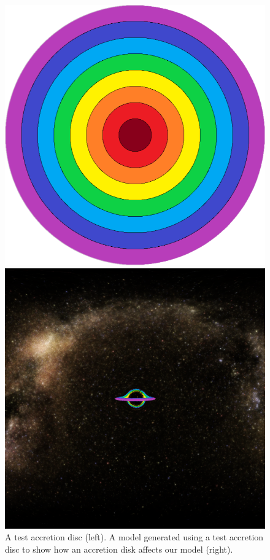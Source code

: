 \documentclass[oneside,openright,frontopenright, singlespacing]{dmathesis}
\begin{document}
\begin{figure}[!ht]
	\centering
	\begin{minipage}{0.5\textwidth}
		\centering
		\includegraphics[width=0.9\linewidth]{img/test-accretion}
	\end{minipage}%
	\hfill
	\begin{minipage}{0.5\textwidth}
		\centering
		\includegraphics[width=0.9\linewidth]{img/milky-way-hdri-accretion}
	\end{minipage}
	\caption{A test accretion disc (left). A model generated using a test accretion disc to show how an accretion disk affects our model (right).}
	\label{fig:Figure5.1}
\end{figure}
\end{document}
